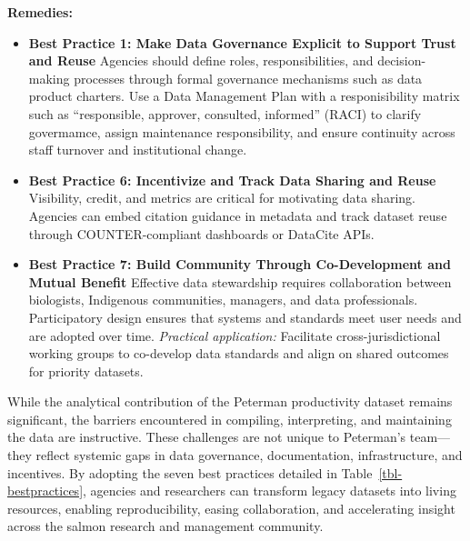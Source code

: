 \documentclass[
  letterpaper,
  DIV=11,
  numbers=noendperiod]{scrartcl}
\begin{document}
\textbf{Remedies:}

\begin{itemize}
\item
  \textbf{Best Practice 1: Make Data Governance Explicit to Support
  Trust and Reuse} Agencies should define roles, responsibilities, and
  decision-making processes through formal governance mechanisms such as
  data product charters. Use a Data Management Plan with a
  responisibility matrix such as ``responsible, approver, consulted,
  informed'' (RACI) to clarify govermamce, assign maintenance
  responsibility, and ensure continuity across staff turnover and
  institutional change.
\item
  \textbf{Best Practice 6: Incentivize and Track Data Sharing and Reuse}
  Visibility, credit, and metrics are critical for motivating data
  sharing. Agencies can embed citation guidance in metadata and track
  dataset reuse through COUNTER-compliant dashboards or DataCite APIs.
\item
  \textbf{Best Practice 7: Build Community Through Co-Development and
  Mutual Benefit} Effective data stewardship requires collaboration
  between biologists, Indigenous communities, managers, and data
  professionals. Participatory design ensures that systems and standards
  meet user needs and are adopted over time. \emph{Practical
  application:} Facilitate cross-jurisdictional working groups to
  co-develop data standards and align on shared outcomes for priority
  datasets.
\end{itemize}

While the analytical contribution of the Peterman productivity dataset
remains significant, the barriers encountered in compiling,
interpreting, and maintaining the data are instructive. These challenges
are not unique to Peterman's team---they reflect systemic gaps in data
governance, documentation, infrastructure, and incentives. By adopting
the seven best practices detailed in Table~\ref{tbl-bestpractices},
agencies and researchers can transform legacy datasets into living
resources, enabling reproducibility, easing collaboration, and
accelerating insight across the salmon research and management
community.
\end{document}

